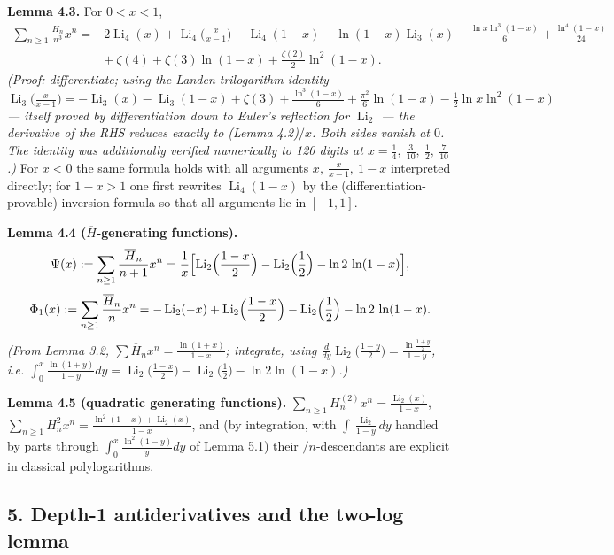 \documentclass[11pt]{article}
\theoremstyle{remark}
\begin{document}
\textbf{Lemma 4.3.} For $0<x<1$,
\[
\begin{aligned}
\sum_{n\ge1}\frac{H_n}{n^3}x^n={}&2\operatorname{Li}_4(x)+\operatorname{Li}_4\!\Big(\frac{x}{x-1}\Big)-\operatorname{Li}_4(1-x)
-\ln(1-x)\operatorname{Li}_3(x)-\frac{\ln x\ln^3(1-x)}{6}+\frac{\ln^4(1-x)}{24}\\
&+\ \zeta(4)+\zeta(3)\ln(1-x)+\frac{\zeta(2)}{2}\ln^2(1-x).
\end{aligned}
\]
\textit{(Proof: differentiate; using the Landen trilogarithm identity
$\operatorname{Li}_3\big(\frac{x}{x-1}\big)=-\operatorname{Li}_3(x)-\operatorname{Li}_3(1-x)+\zeta(3)+\frac{\ln^3(1-x)}{6}+\frac{\pi^2}{6}\ln(1-x)-\frac12\ln x\ln^2(1-x)$
--- itself proved by differentiation down to Euler's reflection for $\operatorname{Li}_2$ --- the derivative of the RHS reduces exactly to (Lemma 4.2)$/x$. Both sides vanish at $0$. The identity was additionally verified numerically to 120 digits at $x=\tfrac14,\ \tfrac3{10},\ \tfrac12,\ \tfrac7{10}$.)}
For $x<0$ the same formula holds with all arguments $x,\ \frac{x}{x-1},\ 1-x$ interpreted directly; for $1-x>1$ one first rewrites $\operatorname{Li}_4(1-x)$ by the (differentiation-provable) inversion formula so that all arguments lie in $[-1,1]$.

\textbf{Lemma 4.4 ($\overline H$-generating functions).}
\[
\Psi(x):=\sum_{n\ge1}\frac{\overline H_n}{n+1}x^{n}
=\frac1x\Bigl[\operatorname{Li}_2\Bigl(\frac{1-x}{2}\Bigr)-\operatorname{Li}_2\Bigl(\frac12\Bigr)-\ln2\,\ln(1-x)\Bigr],
\]
\[
\Phi_1(x):=\sum_{n\ge1}\frac{\overline H_n}{n}x^{n}
=-\operatorname{Li}_2(-x)+\operatorname{Li}_2\Bigl(\frac{1-x}{2}\Bigr)-\operatorname{Li}_2\Bigl(\frac12\Bigr)-\ln2\,\ln(1-x).
\]
\textit{(From Lemma 3.2, $\sum\overline H_nx^n=\frac{\ln(1+x)}{1-x}$; integrate, using $\frac{d}{dy}\operatorname{Li}_2\big(\frac{1-y}2\big)=\frac{\ln\frac{1+y}2}{1-y}$, i.e. $\int_0^x\frac{\ln(1+y)}{1-y}dy=\operatorname{Li}_2\big(\tfrac{1-x}2\big)-\operatorname{Li}_2\big(\tfrac12\big)-\ln2\ln(1-x)$.)}

\textbf{Lemma 4.5 (quadratic generating functions).} $\displaystyle\sum_{n\ge1}H_n^{(2)}x^n=\frac{\operatorname{Li}_2(x)}{1-x}$, $\displaystyle\sum_{n\ge1}H_n^2x^n=\frac{\ln^2(1-x)+\operatorname{Li}_2(x)}{1-x}$, and (by integration, with $\int\frac{\operatorname{Li}_2}{1-y}dy$ handled by parts through $\int_0^x\frac{\ln^2(1-y)}{y}dy$ of Lemma 5.1)
their $/n$-descendants are explicit in classical polylogarithms.

\subsection*{5. Depth-1 antiderivatives and the two-log lemma}
\end{document}
